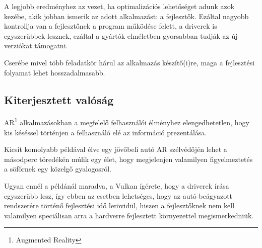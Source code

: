 A legjobb eredm\'enyhez az vezet, ha optimaliz\'aci\'os lehet\H os\'eget adunk azok kez\'ebe, akik jobban ismerik az adott alkalmaz\'ast: a fejleszt\H ok.
Ez\'altal nagyobb kontrollja van a fejleszt\H onek a program m\H uk\"od\'ese felett, a driverek is egyszer\H ubbek lesznek, ez\'altal a gy\'art\'ok elm\'eletben gyorsabban tudj\'ak az \'uj verzi\'okat t\'amogatni.

Cser\'ebe mivel t\"obb feladatk\"or h\'arul az alkalmaz\'as k\'esz\'it\H o(i)re, maga a fejleszt\'esi folyamat lehet hosszadalmasabb.

\subsection{Kiterjesztett val\'os\'ag}
AR\footnote{Augmented Reality} alkalmaz\'asokban a megfelel\H o felhaszn\'al\'oi \'elm\'enyhez elengedhetetlen, hogy kis k\'es\'essel t\"ort\'enjen a felhaszn\'al\'o el\'e az inform\'aci\'o prezent\'al\'asa. 

Kicsit komolyabb p\'eld\'aval \'elve egy j\"ov\H obeli aut\'o AR sz\'elv\'ed\H oj\'en lehet a m\'asodperc t\"ored\'ek\'en m\'ulik egy \'elet, hogy megjelenjen valamilyen figyelmeztet\'es a s\"of\H ornek egy k\"ozelg\H o gyalogosr\'ol.

Ugyan enn\'el a p\'eld\'an\'al maradva, a Vulkan \'ig\'erete, hogy a driverek \'ir\'asa egyszer\H ubb lesz, \'igy ebben az esetben lehets\'eges, hogy az aut\'o be\'agyazott rendszer\'ere t\"ort\'en\H o fejleszt\'esi id\H o ler\"ovid\"ul, hiszen a fejleszt\H oknek nem kell valamilyen speci\'alisan arra a hardverre fejlesztett k\"ornyezettel megismerkedni\"uk. 
